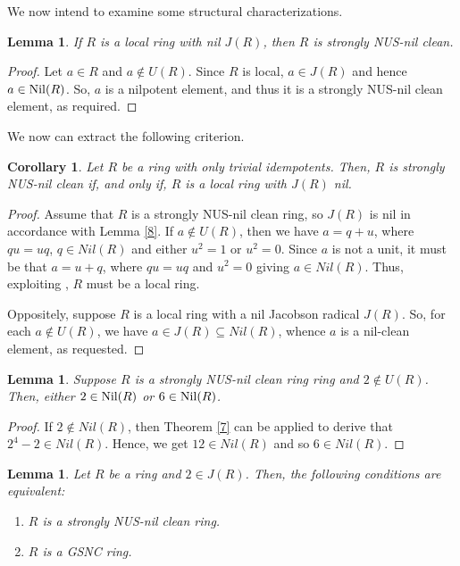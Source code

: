 \documentclass[12pt]{amsart}
\newtheorem{lemma}[theorem]{Lemma}
\newtheorem{corollary}[theorem]{Corollary}
\theoremstyle{definition}
\begin{document}
We now intend to examine some structural characterizations.

\begin{lemma}\label{2.27}
If $R$ is a local ring with nil $J(R)$, then $R$ is strongly NUS-nil clean.
\end{lemma}

\begin{proof}
Let $a\in R$ and $a\notin U(R)$. Since $R$ is local, $a\in J(R)$ and hence $a\in {\rm Nil}(R)$. So, $a$ is a nilpotent element, and thus it is a strongly NUS-nil clean element, as required.
\end{proof}

We now can extract the following criterion.

\begin{corollary}\label{2.50}
Let $R$ be a ring with only trivial idempotents. Then, $R$ is strongly NUS-nil clean if, and only if, $R$ is a local ring with $J(R)$ nil.
\end{corollary}

\begin{proof}
Assume that $R$ is a strongly NUS-nil clean ring, so $J(R)$ is nil in accordance with Lemma \ref{8}. If $a \notin U(R)$, then we have $a=q+u$, where $qu=uq$, $q\in Nil(R)$ and either $u^2=1$ or $u^2=0$. Since $a$ is not a unit, it must be that $a=u+q$, where $qu=uq$ and $u^2=0$ giving $a\in Nil(R)$. Thus, exploiting \cite[Proposition 19.3]{14}, $R$ must be a local ring.
	
Oppositely, suppose $R$ is a local ring with a nil Jacobson radical $J(R)$. So, for each $a \notin U(R)$, we have $a \in J(R) \subseteq Nil(R)$, whence $a$ is a nil-clean element, as requested.
\end{proof}

\begin{lemma}\label{2.55}
Suppose $R$ is a strongly NUS-nil clean ring ring and $2 \notin U(R)$. Then, either $2 \in {\rm Nil}(R)$ or $6 \in {\rm Nil}(R)$.
\end{lemma}

\begin{proof}
If $2\not\in Nil(R)$, then Theorem \ref{7} can be applied to derive that $2^4-2\in Nil(R)$. Hence, we get $12\in Nil(R)$ and so $6\in Nil(R)$.
\end{proof}

\begin{lemma}\label{2.29}
Let $R$ be a ring and $2 \in J(R)$. Then, the following conditions are equivalent:
\begin{enumerate}
\item
$R$ is a strongly NUS-nil clean ring.
\item
$R$ is a GSNC ring.
\end{enumerate}
\end{lemma}
\end{document}
